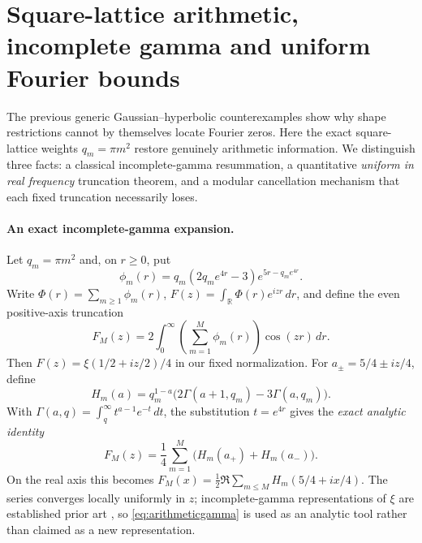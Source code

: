 \section{Square-lattice arithmetic, incomplete gamma and uniform Fourier bounds}
\label{sec:squarelattice}
The previous generic Gaussian--hyperbolic counterexamples
show why shape restrictions cannot by themselves locate
Fourier zeros. Here the exact square-lattice weights
$q_m=\pi m^2$ restore genuinely arithmetic information.
We distinguish three facts: a classical incomplete-gamma
resummation, a quantitative \emph{uniform in real frequency}
truncation theorem, and a modular cancellation mechanism
that each fixed truncation necessarily loses.

\paragraph{An exact incomplete-gamma expansion.}
Let $q_m=\pi m^2$ and, on $r\ge0$, put
\begin{equation}
\phi_m(r)=q_m(2q_me^{4r}-3)e^{5r-q_me^{4r}}.
\label{eq:arithmeticmode}
\end{equation}
Write $\Phi(r)=\sum_{m\ge1}\phi_m(r)$,
$F(z)=\int_{\mathbb R}\Phi(r)e^{izr}\,dr$,
and define the even positive-axis truncation
\[
F_M(z)=2\int_0^\infty
\left(\sum_{m=1}^{M}\phi_m(r)\right)
\cos(zr)\,dr.
\]
Then $F(z)=\xi(1/2+iz/2)/4$ in our fixed normalization.
For $a_\pm=5/4\pm iz/4$, define
\[
H_m(a)=q_m^{1-a}
\bigl(2\Gamma(a+1,q_m)-3\Gamma(a,q_m)\bigr).
\]
With $\Gamma(a,q)=\int_q^\infty t^{a-1}e^{-t}\,dt$,
the substitution $t=e^{4r}$ gives the
\emph{exact analytic identity}
\begin{equation}
F_M(z)=\frac14\sum_{m=1}^{M}
\bigl(H_m(a_+)+H_m(a_-)\bigr).
\label{eq:arithmeticgamma}
\end{equation}
On the real axis this becomes
$F_M(x)=\frac12\Re\sum_{m\le M}H_m(5/4+ix/4)$.
The series converges locally uniformly in $z$;
incomplete-gamma representations of $\xi$ are established
prior art \cite{DF,Haglund,Polson}, so
\eqref{eq:arithmeticgamma} is used as an analytic
tool rather than claimed as a new representation.

